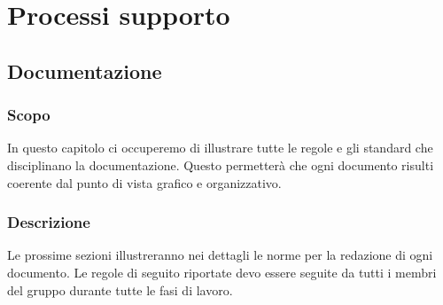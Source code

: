 \section{Processi supporto}
\subsection{Documentazione} \label{_processoDiDocumentazione}

\subsubsection{Scopo}
In questo capitolo ci occuperemo di illustrare tutte le regole e gli standard che disciplinano la documentazione. Questo permetterà che ogni documento risulti coerente dal punto di vista grafico e organizzativo.
\subsubsection{Descrizione}
Le prossime sezioni illustreranno nei dettagli le norme per la redazione di ogni documento.
Le regole di seguito riportate devo essere seguite da tutti i membri del gruppo durante tutte le fasi di lavoro.

